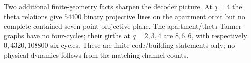 Two additional finite-geometry facts sharpen the decoder picture.  At $q=4$ the theta relations give $54400$ binary projective lines on the apartment orbit but no complete contained seven-point projective plane.  The apartment/theta Tanner graphs have no four-cycles; their girths at $q=2,3,4$ are $8,6,6$, with respectively $0,4320,108800$ six-cycles.  These are finite code/building statements only; no physical dynamics follows from the matching channel counts.
